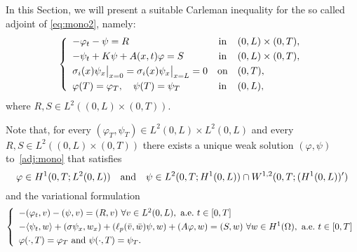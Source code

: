 \documentclass[10pt]{article}
\def\dis{\displaystyle}
\def\Om{\Omega}
\def\\Phivec{\mathbf{\Phi}}
\begin{document}
	In this Section, we will present a suitable Carleman inequality for the so called adjoint of \eqref{eq:mono2},
	namely:
\begin{equation}\label{adj:mono}
	\left\{
		\begin{array}{lcl}
			- \varphi_t  -\psi=R 					&\mbox{in}&	 (0,L) \times (0,T), 		\\
			\noalign{\smallskip}\dis
			-\psi_t+  K\psi+A(x,t)\varphi=S 	&\mbox{in}&	 (0,L) \times (0,T),  		\\
			\noalign{\smallskip}\dis
			\sigma_i(x)\psi_{x}\big|_{x=0}=\sigma_i(x)\psi_{x}\big|_{x=L} = 0     				&\mbox{on}&	(0,T), 	\\
			\noalign{\smallskip}\dis
			\varphi(T) = \varphi_T,\quad\psi(T) = \psi_T 		&\mbox{in}&	(0,L),
		\end{array}
	\right.
\end{equation}
	where $R,S\in L^2((0,L)\times(0,T))$.
	
	Note that, for every $( \varphi_T,\psi_T )\in L^2(0,L)\times L^2(0,L)$ and every
	$R,S\in L^2((0,L)\times(0,T))$
	there exists a unique weak solution $(\varphi,\psi)$ to~\eqref{adj:mono} that satisfies
\[
	\varphi \in H^1(0,T;L^2(0,L))
	\quad\hbox{and}\quad
	\psi\in  L^2(0,T;H^1(0,L))\cap W^{1,2}(0,T;(H^1(0,L))')
\]
	and the variational formulation
$$
	\left\{
		\begin{array}{l}
	-(\varphi_t,v)-(\psi, v)=(R,v)~\forall v\in L^2(0,L),~\hbox{a.e.}~ t\in[0,T]\\
	\noalign{\smallskip}\dis
	-\langle\psi_t,w\rangle+(\sigma\psi_x, w_x) +(\ell_p(\bar v,\bar w)\psi,w)
	+ (A\varphi,w)=(S,w)~\forall w\in H^1(\Om),~\hbox{a.e.}~ t\in[0,T]\\
	\noalign{\smallskip}\dis
	\varphi(\cdot,T)=\varphi_T ~\hbox{and}~\psi(\cdot,T)=\psi_T.
		\end{array}
	\right.
$$
	
\end{document}
